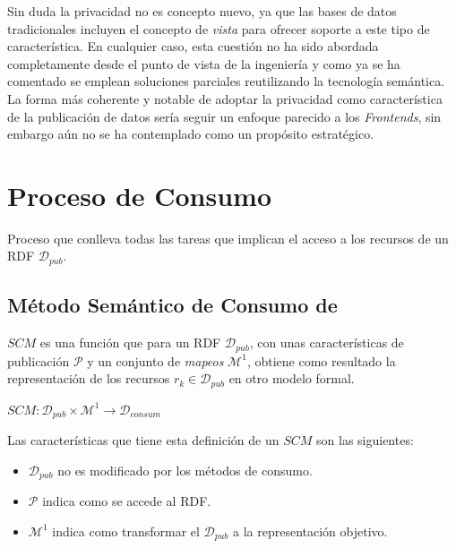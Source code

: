 Sin duda la privacidad no es concepto nuevo, ya que las bases de datos tradicionales incluyen el concepto
de \textit{vista} para ofrecer soporte a este tipo de característica. En cualquier caso, esta cuestión no ha sido abordada
completamente desde el punto de vista de la ingeniería y como ya se ha comentado se emplean soluciones parciales
reutilizando la tecnología semántica. La forma más coherente y notable de adoptar la privacidad como característica
de la publicación de datos sería seguir un enfoque parecido a los \linkeddata \textit{Frontends}, sin embargo aún no se ha contemplado 
como un propósito estratégico.

\section{Proceso de Consumo}

\begin{definition}[Consumo]
Proceso que conlleva todas las tareas que implican el acceso a los recursos de un \dataset \gls{RDF} $\mathcal{D}_{pub}$.
\end{definition}


\subsection{Método Semántico de Consumo de \linkeddata}\label{sect:proceso-consumo}
\begin{definition}
$SCM$ es una función que para un \dataset RDF $\mathcal{D}_{pub}$, con unas características de publicación $\mathcal{P}$ y un conjunto de \textit{mapeos}
$\mathcal{M}^1$, obtiene como resultado la representación de los recursos $r_k \in \mathcal{D}_{pub}$ en otro modelo formal.
\end{definition}

\begin{center}
    $SCM :  \mathcal{D}_{pub} \times \mathcal{M}^1 \longrightarrow \mathcal{D}_{consum}$
\end{center}
Las características que tiene esta definición de un $SCM$ son las siguientes:
\begin{itemize}
 \item $\mathcal{D}_{pub}$ no es modificado por los métodos de consumo.
 \item $\mathcal{P}$ indica como se accede al \dataset \gls{RDF}.
 \item $\mathcal{M}^1$ indica como transformar el \dataset $\mathcal{D}_{pub}$ a la representación objetivo.
 \end{itemize}

